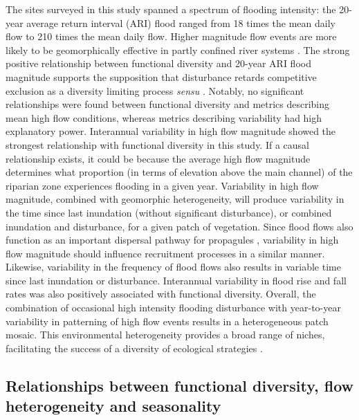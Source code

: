 \documentclass[openright,12pt,a4paper]{memoir}
\begin{document}
The sites surveyed in this study spanned a spectrum of flooding intensity: the 20-year average return interval (ARI) flood ranged from 18 times the mean daily flow to 210 times the mean daily flow. Higher magnitude flow events are more likely to be geomorphically effective in partly confined river systems \citep{Huang2006}. The strong positive relationship between functional diversity and 20-year ARI flood magnitude supports the supposition that disturbance retards competitive exclusion as a diversity limiting process \textit{sensu} \citet{Huston1979}. Notably, no significant relationships were found between functional diversity and metrics describing mean high flow conditions, whereas metrics describing variability had high explanatory power. Interannual variability in high flow magnitude showed the strongest relationship with functional diversity in this study. If a causal relationship exists, it could be because the average high flow magnitude determines what proportion (in terms of elevation above the main channel) of the riparian zone experiences flooding in a given year. Variability in high flow magnitude, combined with geomorphic heterogeneity, will produce variability in the time since last inundation (without significant disturbance), or combined inundation and disturbance, for a given patch of vegetation. Since flood flows also function as an important dispersal pathway for propagules \citep{Merritt2010a}, variability in high flow magnitude should influence recruitment processes in a similar manner.  Likewise, variability in the frequency of flood flows also results in variable time since last inundation or disturbance. Interannual variability in flood rise and fall rates was also positively associated with functional diversity. Overall, the combination of occasional high intensity flooding disturbance with year-to-year variability in patterning of high flow events results in a heterogeneous patch mosaic. This environmental heterogeneity provides a broad range of niches, facilitating the success of a diversity of ecological strategies \citep{Bornette2008}.

\subsection*{Relationships between functional diversity, flow heterogeneity and seasonality}
 
\end{document}
